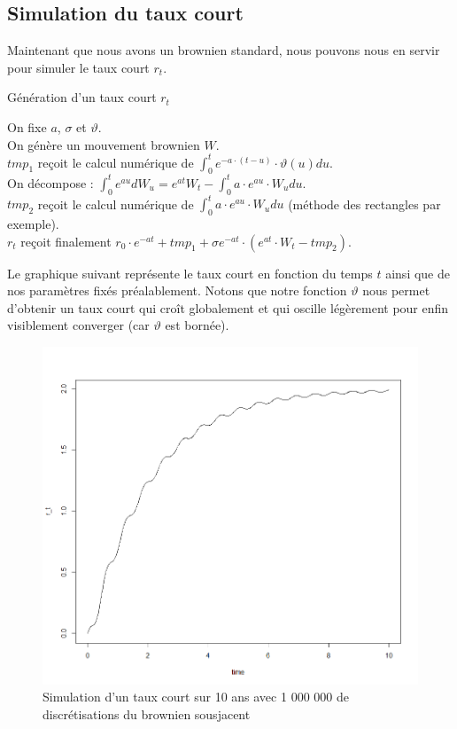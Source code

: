 \documentclass[11pt]{article}
\let\vega\vartheta
\begin{document}
\subsection{Simulation du taux court}
Maintenant que nous avons un brownien standard, nous pouvons nous en servir pour simuler le taux court $r_{t}$.
\begin{algorithm}[H]
\caption{Génération d'un taux court $r_{t}$}
On fixe $a$, $\sigma$ et $\vega$.\\
On génère un mouvement brownien $W$.\\
$tmp_1$ reçoit le calcul numérique de $\int^{t}_{0}e^{-a\cdot(t-u)}\cdot \vega(u) du$.\\
On décompose : $\int^{t}_{0}e^{au}dW_{u} = e^{at}W_{t} - \int^{t}_{0}a \cdot e^{au} \cdot W_u du$.\\
$tmp_2$ reçoit le calcul numérique de $\int^{t}_{0}a \cdot e^{au} \cdot W_{u} du$ (méthode des rectangles par exemple).\\
$r_{t}$ reçoit finalement $r_{0} \cdot e^{-at} + tmp_{1} + \sigma e^{-at} \cdot (e^{at} \cdot W_{t} - tmp_{2})$.
\end{algorithm}


Le graphique suivant représente le taux court en fonction du temps $t$ ainsi que de nos paramètres fixés préalablement. Notons que notre fonction $\vega$ nous permet d'obtenir un taux court qui croît globalement et qui oscille légèrement pour enfin visiblement converger (car $\vega$ est bornée).
\begin{figure}[H]
         \centering \includegraphics[scale=0.55]{taux_court}
        \caption{Simulation d'un taux court sur 10 ans avec 1 000 000 de discrétisations du brownien sousjacent}
\end{figure}
\end{document}
